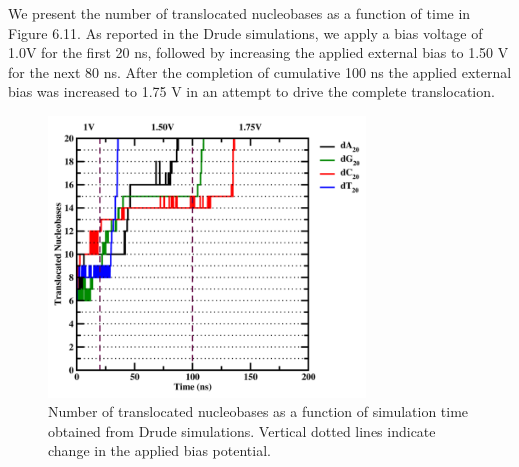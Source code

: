 We present the number of translocated nucleobases as a function of time in Figure 6.11. As reported in the Drude simulations, we apply a bias voltage of 1.0V for the first 20 ns, followed by increasing the applied external bias to 1.50 V for the next 80 ns. After the completion of cumulative 100 ns the applied external bias was increased to 1.75 V in an attempt to drive the complete translocation. 
\begin{figure}
    \centering
    \includegraphics[width=0.75\textwidth]{Chapter4/Figures/Figure10.png}
    \caption[DNA translocation through nanopores in a three-layer graphene membrane in Drude polarizable FF starting from a different conformation]{Number of translocated nucleobases as a function of simulation time obtained from Drude simulations. Vertical dotted lines indicate change in the applied bias potential.}
\end{figure}

